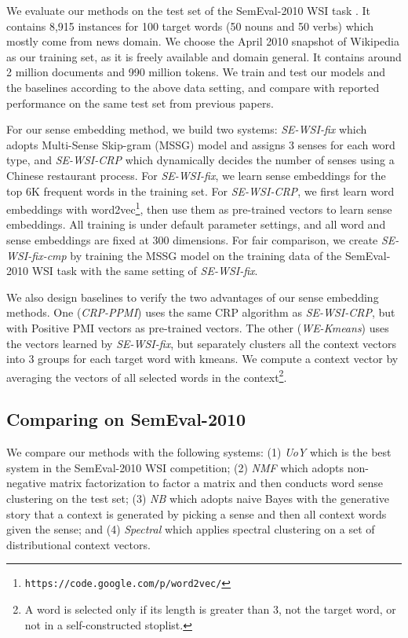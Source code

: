 \documentclass[11pt]{article}
\begin{document}
We evaluate our methods on the test set of the SemEval-2010 WSI task \cite{manandhar2010semeval}.
It contains 8,915 instances for 100 target words (50 nouns and 50 verbs) which mostly come from news domain.
We choose the April 2010 snapshot of Wikipedia \cite{wiki2010} as our training set, as it is freely available and domain general.
It contains around 2 million documents and 990 million tokens.
We train and test our models and the baselines according to the above data setting, and compare with reported performance on the same test set from previous papers.


For our sense embedding method, we build two systems: 
\emph{SE-WSI-fix} which adopts Multi-Sense Skip-gram (MSSG) model \cite{neelakantan-EtAl:2014:EMNLP2014} and assigns 3 senses for each word type,
and \emph{SE-WSI-CRP} \cite{li-jurafsky:2015:EMNLP} which dynamically decides the number of senses using a Chinese restaurant process.
For \emph{SE-WSI-fix}, we learn sense embeddings for the top 6K frequent words in the training set. For \emph{SE-WSI-CRP}, we first learn word embeddings with word2vec\footnote{\texttt{https://code.google.com/p/word2vec/}}, 
then use them as pre-trained vectors to learn sense embeddings.
All training is under default parameter settings, and all word and sense embeddings are fixed at 300 dimensions.
For fair comparison, we create \emph{SE-WSI-fix-cmp} by training the MSSG model on the training data of the SemEval-2010 WSI task with the same setting of \emph{SE-WSI-fix}.

We also design baselines to verify the two advantages of our sense embedding methods.
One (\emph{CRP-PPMI}) uses the same CRP algorithm as \emph{SE-WSI-CRP}, but with Positive PMI vectors as pre-trained vectors.
The other (\emph{WE-Kmeans}) uses the vectors learned by \emph{SE-WSI-fix}, but separately clusters all the context vectors into 3 groups for each target word with kmeans.
We compute a context vector by averaging the vectors of all selected words in the context\footnote{A word is selected only if its length is greater than 3, not the target word, or not in a self-constructed stoplist.}.

\subsection{Comparing on SemEval-2010}

We compare our methods with the following systems: (1) 
\emph{UoY} \cite{korkontzelos-manandhar:2010:SemEval} which is the best system in the SemEval-2010 WSI competition;
(2) \emph{NMF} \cite{vandecruys-apidianaki:2011:ACL-HLT2011} which adopts non-negative matrix factorization to factor a matrix and then conducts word sense clustering on the test set; 
(3) \emph{NB} \cite{choe-charniak:2013:EMNLP} which adopts naive Bayes with the generative story that a context is generated by picking a sense and then all context words given the sense; 
and (4) \emph{Spectral} \cite{goyal2014unsupervised} which applies spectral clustering on a set of distributional context vectors.
\end{document}
